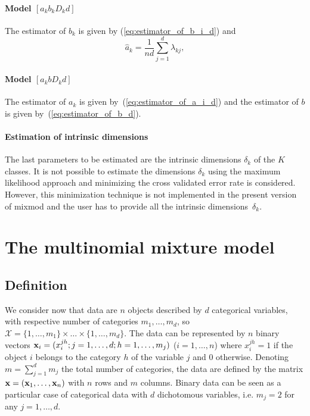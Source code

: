 \documentclass[12pt]{article}
\begin{document}
\paragraph{Model $[a_{k}b_{k}D_{k}d]$}
The estimator of $b_{k}$ is given by (\ref{eq:estimator_of_b_i_d}) and
\begin{equation}
  \hat{a}_{k}=\frac{1}{nd}\sum_{j=1}^{d}\lambda_{kj},
  \label{eq:estimator_of_a_i_d}
\end{equation}

\paragraph{Model $[a_{k}bD_{k}d]$}
The estimator of $a_{k}$ is given by~(\ref{eq:estimator_of_a_i_d}) and the estimator of $b$ is
given by~(\ref{eq:estimator_of_b_d}).

\paragraph{Estimation of intrinsic dimensions}
The last parameters to be estimated are the intrinsic dimensions $\delta_k$ of the $K$
classes. It is not possible to estimate the dimensions $\delta_k$ using the maximum likelihood
approach and minimizing the cross validated error rate is considered.  However, this
minimization technique is not implemented in the present version of {\sc mixmod} and the user
has to provide all the intrinsic dimensions~$\delta_k$.


\section{The multinomial mixture model}
\subsection{Definition}
We consider now that data are $n$ objects described by $d$ categorical variables, with
respective number of categories $m_1,\ldots,m_d$, so ${\mathcal X}=\{1,\ldots,m_1\}\times\ldots\times\{1,\ldots,m_d\}$. The data can be represented by $n$ binary
vectors ${\bf x}_i = (x_i^{jh} ; j=1,\ldots,d; h = 1,\ldots,m_j)$ ($i=1,\ldots,n$) where
$x_i^{jh}=1$ if the object $i$ belongs to the category $h$ of the variable $j$ and 0 otherwise.
Denoting $m=\sum_{j=1}^dm_j$ the total number of categories, the data are defined by the matrix
${\bf x} = ({\bf x}_1,\ldots,{\bf x}_n)$ with $n$ rows and $m$ columns.  Binary data can be
seen as a particular case of categorical data with $d$ dichotomous variables, i.e.  $m_j=2$ for
any $j=1,\ldots,d$.
\end{document}
